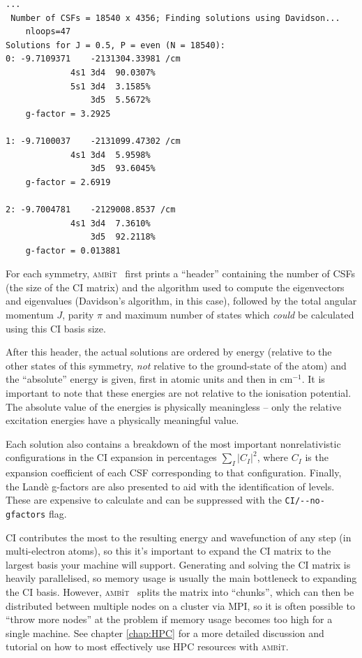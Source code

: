 \documentclass{report}
\newcommand{\ambit}{\textsc{amb}{\footnotesize i}\textsc{t}}
\begin{document}
\begin{verbatim}
...
 Number of CSFs = 18540 x 4356; Finding solutions using Davidson...
    nloops=47
Solutions for J = 0.5, P = even (N = 18540):
0: -9.7109371    -2131304.33981 /cm
             4s1 3d4  90.0307%
             5s1 3d4  3.1585%
                 3d5  5.5672%
    g-factor = 3.2925

1: -9.7100037    -2131099.47302 /cm
             4s1 3d4  5.9598%
                 3d5  93.6045%
    g-factor = 2.6919

2: -9.7004781    -2129008.8537 /cm
             4s1 3d4  7.3610%
                 3d5  92.2118%
    g-factor = 0.013881

\end{verbatim}

For each symmetry, \ambit~ first prints a ``header'' containing the number of CSFs 
(the size of the CI matrix) and the algorithm used to compute the eigenvectors and eigenvalues 
(Davidson's algorithm, in this case), followed by the total angular momentum $J$, parity $\pi$ and 
maximum number of states which \textit{could} be calculated using this CI basis size.

After this header, the actual solutions are ordered by energy (relative to the other states of this
symmetry, \emph{not} relative to the ground-state of the atom) and the ``absolute'' energy is given,
first in atomic units and then in cm$^{-1}$. It is important to note that these energies are not
relative to the ionisation potential. The absolute value of the energies is physically meaningless --
only the relative excitation energies have a physically meaningful value.

Each solution also contains a breakdown of the most important nonrelativistic configurations in the CI
expansion in percentages $\displaystyle \sum_I |C_I|^2$, where $C_I$ is the expansion coefficient of
each CSF corresponding to that configuration. Finally, the Land\`{e} g-factors are also presented to aid
with the identification of levels. These are expensive to calculate and can be suppressed with the
\texttt{CI/{-}{-}no-gfactors} flag.

CI contributes the most to the resulting energy and wavefunction of any step (in multi-electron atoms),
so this it's important to expand the CI matrix to the largest basis your machine will support.
Generating and solving the CI matrix is heavily parallelised, so memory usage is usually the main
bottleneck to expanding the CI basis. However, \ambit~ splits the matrix into ``chunks'', which can then
be distributed between multiple nodes on a cluster via MPI, so it is often possible to ``throw more
nodes'' at the problem if memory usage becomes too high for a single machine. See chapter \ref{chap:HPC}
for a more detailed discussion and tutorial on how to most effectively use HPC resources with \ambit.
\end{document}
